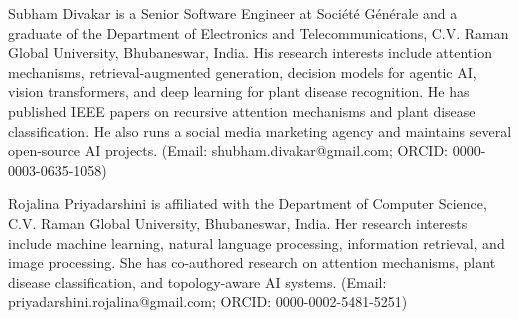 \documentclass[twocolumn]{ICCKjournal}
\begin{document}
\makeatletter
\if@twocolumn

  \begin{biography}[author1]{Subham Divakar} is a Senior Software Engineer at Soci\'{e}t\'{e} G\'{e}n\'{e}rale and a graduate of the Department of Electronics and Telecommunications, C.V. Raman Global University, Bhubaneswar, India. His research interests include attention mechanisms, retrieval-augmented generation, decision models for agentic AI, vision transformers, and deep learning for plant disease recognition. He has published IEEE papers on recursive attention mechanisms and plant disease classification. He also runs a social media marketing agency and maintains several open-source AI projects. (Email: shubham.divakar@gmail.com; ORCID: 0000-0003-0635-1058)
  \end{biography}

  \begin{biography}[author2]{Rojalina Priyadarshini} is affiliated with the Department of Computer Science, C.V. Raman Global University, Bhubaneswar, India. Her research interests include machine learning, natural language processing, information retrieval, and image processing. She has co-authored research on attention mechanisms, plant disease classification, and topology-aware AI systems. (Email: priyadarshini.rojalina@gmail.com; ORCID: 0000-0002-5481-5251)
  \end{biography}

\else
\fi
\makeatother
\end{document}
